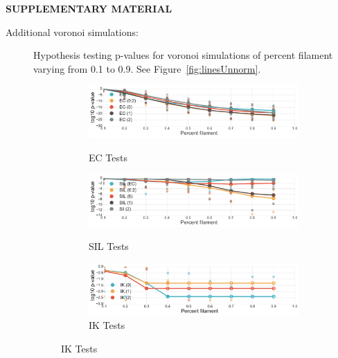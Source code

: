 \documentclass[12pt]{article}
\newcommand{\figref}[1]{Figure~\ref{#1}}
\begin{document}

\bigskip
\begin{center}
{\large\bf SUPPLEMENTARY MATERIAL}
\end{center}

\begin{description}
  \item[Additional voronoi simulations:] Hypothesis testing p-values for voronoi simulations of percent filament varying from 0.1 to 0.9. See \figref{fig:linesUnnorm}.

  \begin{center}
    \begin{figure}[htp!]
      \centering
      \begin{subfigure}{.5\textwidth}
        \centering
        \caption{EC Tests}
        \includegraphics[width=\linewidth]{figure_8_all_euler_group.pdf}
        \label{fig:all_euler}
      \end{subfigure}
      \begin{subfigure}{.5\textwidth}
        \centering
        \caption{SIL Tests}
        \includegraphics[width=\linewidth]{figure_8_all_silhouette_group.pdf}
        \label{fig:all_silh}
      \end{subfigure}
      \begin{subfigure}{.5\textwidth}
        \centering
        \caption{IK Tests}
        \includegraphics[width=\linewidth]{figure_8_all_contour_group.pdf}

\end{subfigure}
\end{figure}
\end{center}
\end{description}
\end{document}
